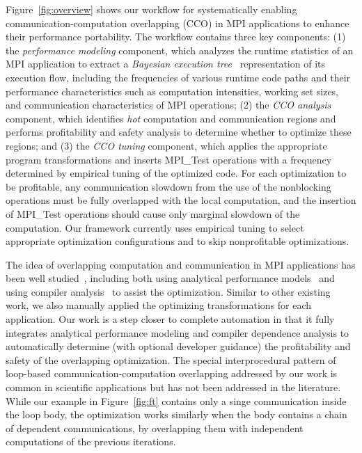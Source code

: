 Figure~\ref{fig:overview} shows our workflow for systematically
enabling communication-computation overlapping (CCO) in MPI
applications to enhance their performance portability.  The
workflow contains three key components: (1) the \emph{performance
  modeling} component, which analyzes the runtime statistics of an MPI
application to extract a \emph{Bayesian execution
  tree}~\cite{jichi:ipdps14} representation of its execution flow,
including the frequencies of various runtime code paths and their
performance characteristics such as computation intensities, working
set sizes, and communication characteristics of MPI operations; (2)
the \emph{CCO analysis} component, which identifies \emph{hot}
computation and communication regions
and performs profitability and safety
analysis to determine whether to optimize these regions; and (3) the \emph{CCO
  tuning} component, which applies the appropriate program
transformations
and inserts MPI\_Test operations with a frequency
determined by empirical tuning of the optimized code.
For each optimization to be profitable, any
communication slowdown from the use of the nonblocking operations must
be fully overlapped with the local computation, and the insertion of
MPI\_Test operations should cause only marginal slowdown of the computation.
Our framework currently
uses empirical tuning to select appropriate
optimization configurations and to skip nonprofitable optimizations.

The idea of overlapping computation and communication in MPI applications has been
well studied~\cite{danalis:sc05,fishgold:ipdps06}, including both using analytical performance
models~\cite{iancu:ppopp07}
and using compiler analysis~\cite{danalis:ics09} to assist the optimization.
Similar to other existing work, we also manually applied the optimizing transformations for each application.
Our work is a step closer to complete automation in that it fully integrates analytical performance modeling and compiler dependence analysis to automatically
determine (with optional developer guidance) the profitability and safety of the overlapping optimization. %
The special interprocedural pattern of loop-based
communication-computation overlapping addressed by our work is common in scientific applications but has not been addressed in the literature.
While our example in Figure~\ref{fig:ft} contains only a singe communication inside the loop body, the optimization works similarly
when the body contains a chain of dependent communications, by overlapping them with independent computations of the previous iterations.

